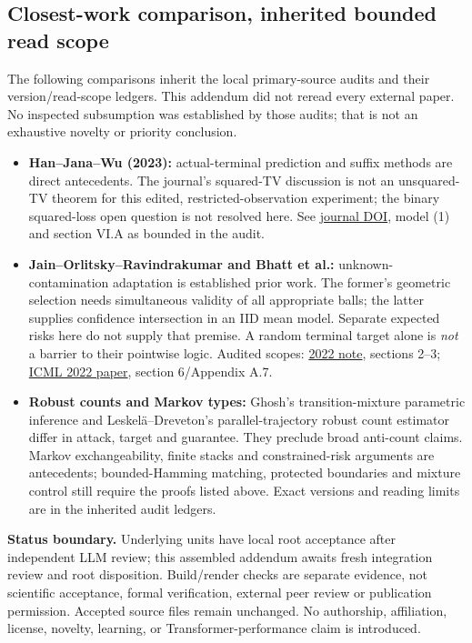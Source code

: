 \documentclass[10pt]{article}
\begin{document}
\subsection*{Closest-work comparison, inherited bounded read scope}
The following comparisons inherit the local primary-source audits and their version/read-scope ledgers. This addendum did not reread every external paper. No inspected subsumption was established by those audits; that is not an exhaustive novelty or priority conclusion.
\begin{itemize}
\item \textbf{Han--Jana--Wu (2023):} actual-terminal prediction and suffix methods are direct antecedents. The journal's squared-TV discussion is not an unsquared-TV theorem for this edited, restricted-observation experiment; the binary squared-loss open question is not resolved here. See \href{https://doi.org/10.1109/TIT.2023.3239508}{journal DOI}, model (1) and section VI.A as bounded in the audit.
\item \textbf{Jain--Orlitsky--Ravindrakumar and Bhatt et al.:} unknown-contamination adaptation is established prior work. The former's geometric selection needs simultaneous validity of all appropriate balls; the latter supplies confidence intersection in an IID mean model. Separate expected risks here do not supply that premise. A random terminal target alone is \emph{not} a barrier to their pointwise logic. Audited scopes: \href{https://arxiv.org/pdf/2202.05453v1}{2022 note}, sections 2--3; \href{https://proceedings.mlr.press/v162/bhatt22a/bhatt22a.pdf}{ICML 2022 paper}, section 6/Appendix A.7.
\item \textbf{Robust counts and Markov types:} Ghosh's transition-mixture parametric inference and Leskel\"a--Dreveton's parallel-trajectory robust count estimator differ in attack, target and guarantee. They preclude broad anti-count claims. Markov exchangeability, finite stacks and constrained-risk arguments are antecedents; bounded-Hamming matching, protected boundaries and mixture control still require the proofs listed above. Exact versions and reading limits are in the inherited audit ledgers.
\end{itemize}
\textbf{Status boundary.} Underlying units have local root acceptance after independent LLM review; this assembled addendum awaits fresh integration review and root disposition. Build/render checks are separate evidence, not scientific acceptance, formal verification, external peer review or publication permission. Accepted source files remain unchanged. No authorship, affiliation, license, novelty, learning, or Transformer-performance claim is introduced.
\end{document}
